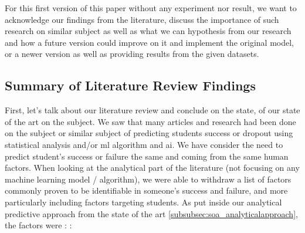 \documentclass[../main.tex]{subfiles}
\begin{document}
For this first version of this paper without any experiment nor result, we want to acknowledge our findings from the literature, discuss the importance of such research on similar subject as well as what we can hypothesis from our research and how a future version could improve on it and implement the original model, or a newer version as well as providing results from the given datasets.

\subsection{Summary of Literature Review Findings}
First, let's talk about our literature review and conclude on the state, of our state of the art on the subject.
We saw that many articles and research had been done on the subject or similar subject of predicting students success or dropout using statistical analysis and/or \acrfull{ml} algorithm and \acrfull{ai}.
We have consider the need to predict student's success or failure the same and coming from the same human factors. When looking at the analytical part of the literature (not focusing on any machine learning model / algorithm), we were able to withdraw a list of factors commonly proven to be identifiable in someone's success and failure, and more particularly including factors targeting students. As put inside our analytical predictive approach from the state of the art \ref{subsubsec:soa_analyticalapproach}, the factors were : 
\cite{opazo_analysis_2021,tinto_dropout_1975,caspersen_teachers_2015,lidia_problema_2006,bejarano_caso_2017,sinchi_acceso_2018,cavero_voluntad_2011,velasco_alisis_nodate}: 
\end{document}
